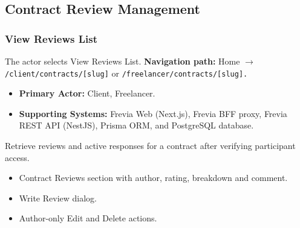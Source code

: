 

\subsection{Contract Review Management}

\subsubsection{View Reviews List}

The actor selects View Reviews List.\newline
\textbf{Navigation path:} Home $\rightarrow$ \texttt{/\allowbreak{}client/\allowbreak{}contracts/\allowbreak{}[slug]} or \texttt{/\allowbreak{}freelancer/\allowbreak{}contracts/\allowbreak{}[slug].}


\begin{itemize}[leftmargin=1.6em,topsep=3pt,itemsep=2pt,parsep=0pt,label=$\bullet$]
    \item \textbf{Primary Actor:} Client, Freelancer.
    \item \textbf{Supporting Systems:} Frevia Web (Next.js), Frevia BFF proxy, Frevia REST API (NestJS), Prisma ORM, and PostgreSQL database.
\end{itemize}

\noindent Retrieve reviews and active responses for a contract after verifying participant access.

\begin{itemize}[leftmargin=1.6em,topsep=3pt,itemsep=2pt,parsep=0pt,label=$\bullet$]
    \item Contract Reviews section with author, rating, breakdown and comment.
    \item Write Review dialog.
    \item Author-only Edit and Delete actions.
\end{itemize}

